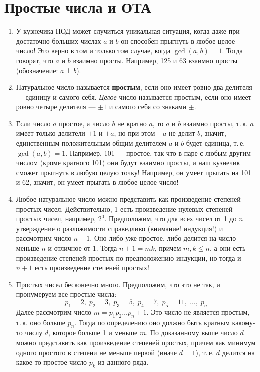 \section{Простые числа и ОТА}\label{PrimeNumbers}


\begin{enumerate}
\item У кузнечика НОД может случиться уникальная ситуация, когда даже при достаточно больших числах $a$ и $b$ он способен прыгнуть в любое целое число! Это верно в том и только том случае, когда $\gcd(a,b)=1$. Тогда говорят, что $a$ и $b$ взаимно просты. Например, 125 и 63 взаимно просты (обозначение: $a\perp b$).
\item Натуральное число называется \textbf{простым}, если оно имеет ровно два делителя --- единицу и самого себя. \textit{Целое} число называется простым, если оно имеет ровно четыре делителя --- $\pm 1$ и самого себя со знаками $\pm$.
\item Если число $a$ простое, а число $b$ не кратно $a$, то $a$ и $b$ взаимно просты, т.\,к. $a$ имеет только делители $\pm 1$ и $\pm a$, но при этом $\pm a$ не делит $b$, значит, единственным положительным общим делителем $a$ и $b$ будет единица, т.\,е. $\gcd(a,b)=1$.
 Например, 101 --- простое, так что в паре с любым другим числом (кроме кратного 101) они будут взаимно просты, и наш кузнечик сможет прыгнуть в любую целую точку! Например, он умеет прыгать на 101 и 62, значит, он умеет прыгать в любое целое число!

\item Любое натуральное число можно представить как произведение степеней простых чисел. Действительно, 1 есть произведение нулевых степеней простых чисел, например, $2^0$. Предположим, что для всех чисел от 1 до $n$ утверждение о разложимости справедливо (внимание! индукция!) и рассмотрим число $n+1$. Оно либо уже простое, либо делится на число меньше $n$ и отличное от 1. Тогда $n+1=mk$, причем $m,k\le n$, а они есть произведение степеней простых по предположению индукции, но тогда и $n+1$ есть произведение степеней простых!
\item Простых чисел бесконечно много. Предположим, что это не так, и пронумеруем все простые числа:
$$
p_1=2,\;p_2=3,\;p_3=5,\;p_4=7,\;p_5=11,\;\dots,\;p_n
$$
Далее рассмотрим число $m=p_1p_2\dots p_n+1$. Это число не является простым, т.\,к. оно больше $p_n$. Тогда по определению оно должно быть кратным какому-то числу $d$, которое больше 1 и меньше $m$. По доказанному выше число $d$ можно представить как произведение степеней простых, причем как минимум одного простого в степени не меньше первой (иначе $d=1$), т.\,е. $d$ делится на какое-то простое число $p_k$ из данного ряда.


\end{enumerate}
